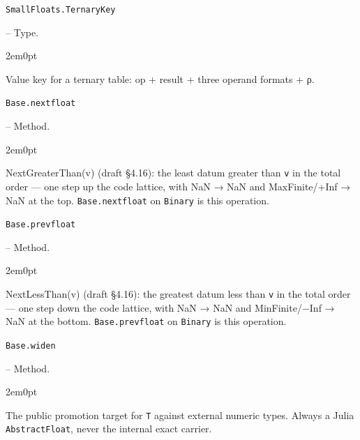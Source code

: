 \par\medskip\noindent\begin{minipage}{\linewidth}
\hypertarget{9239390415321841063}{\texttt{SmallFloats.TernaryKey}}  -- {Type.}
\nopagebreak
\begin{adjustwidth}{2em}{0pt}

Value key for a ternary table: op + result + three operand formats + ρ.



\end{adjustwidth}
\end{minipage}
\par\medskip

\par\medskip\noindent\begin{minipage}{\linewidth}
\hypertarget{7671132794519427917}{\texttt{Base.nextfloat}}  -- {Method.}
\nopagebreak
\begin{adjustwidth}{2em}{0pt}

NextGreaterThan(v) (draft §4.16): the least datum greater than \texttt{v} in the total order — one step up the code lattice, with NaN → NaN and MaxFinite/+Inf → NaN at the top. \texttt{Base.nextfloat} on \texttt{Binary} is this operation.



\end{adjustwidth}
\end{minipage}
\par\medskip

\par\medskip\noindent\begin{minipage}{\linewidth}
\hypertarget{8297310150874586961}{\texttt{Base.prevfloat}}  -- {Method.}
\nopagebreak
\begin{adjustwidth}{2em}{0pt}

NextLessThan(v) (draft §4.16): the greatest datum less than \texttt{v} in the total order — one step down the code lattice, with NaN → NaN and MinFinite/−Inf → NaN at the bottom. \texttt{Base.prevfloat} on \texttt{Binary} is this operation.



\end{adjustwidth}
\end{minipage}
\par\medskip

\par\medskip\noindent\begin{minipage}{\linewidth}
\hypertarget{17551943659563969876}{\texttt{Base.widen}}  -- {Method.}
\nopagebreak
\begin{adjustwidth}{2em}{0pt}

The public promotion target for \texttt{T} against external numeric types. Always a Julia \texttt{AbstractFloat}, never the internal exact carrier.



\end{adjustwidth}
\end{minipage}
\par\medskip

